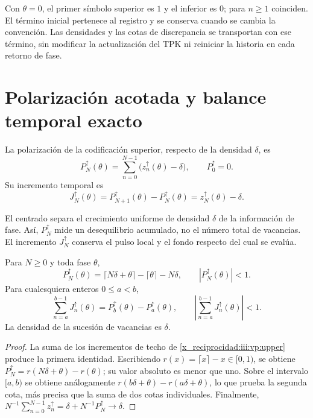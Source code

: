 Con $\theta=0$, el primer símbolo superior es $1$ y el inferior es $0$;
para $n\geq1$ coinciden. El término inicial pertenece al registro y se
conserva cuando se cambia la convención. Las densidades y las cotas de
discrepancia se transportan con ese término, sin modificar la actualización
del TPK ni reiniciar la historia en cada retorno de fase.

\section{Polarización acotada y balance temporal exacto}

\begin{definition}
La polarización de la codificación superior, respecto de la densidad
$\delta$, es
\begin{equation}
 P_N^{\uparrow}(\theta)
 =\sum_{n=0}^{N-1}\bigl(z_n^{\uparrow}(\theta)-\delta\bigr),
 \qquad P_0^{\uparrow}=0.
 \label{x_reciprocidad:iii:vp:polarization}
\end{equation}
Su incremento temporal es
\begin{equation}
 J_N^{\uparrow}(\theta)
 =P_{N+1}^{\uparrow}(\theta)-P_N^{\uparrow}(\theta)
 =z_N^{\uparrow}(\theta)-\delta.
 \label{x_reciprocidad:iii:vp:current}
\end{equation}
\end{definition}

El centrado separa el crecimiento uniforme de densidad $\delta$ de la
información de fase. Así, $P_N^{\uparrow}$ mide un desequilibrio acumulado,
no el número total de vacancias. El incremento $J_N^{\uparrow}$ conserva
el pulso local y el fondo respecto del cual se evalúa.

\begin{theorem}
Para $N\geq0$ y toda fase $\theta$,
\begin{equation}
 P_N^{\uparrow}(\theta)
 =\lceil N\delta+\theta\rceil-\lceil\theta\rceil-N\delta,
 \qquad |P_N^{\uparrow}(\theta)|<1.
 \label{x_reciprocidad:iii:vp:bound}
\end{equation}
Para cualesquiera enteros $0\leq a<b$,
\begin{equation}
 \sum_{n=a}^{b-1}J_n^{\uparrow}(\theta)
 =P_b^{\uparrow}(\theta)-P_a^{\uparrow}(\theta),
 \qquad
 \left|\sum_{n=a}^{b-1}J_n^{\uparrow}(\theta)\right|<1.
 \label{x_reciprocidad:iii:vp:continuity}
\end{equation}
La densidad de la sucesión de vacancias es $\delta$.
\end{theorem}
\begin{proof}
La suma de los incrementos de techo de \eqref{x_reciprocidad:iii:vp:upper} produce la
primera identidad. Escribiendo $r(x)=\lceil x\rceil-x\in[0,1)$,
se obtiene $P_N^{\uparrow}=r(N\delta+\theta)-r(\theta)$; su valor
absoluto es menor que uno. Sobre el intervalo $[a,b)$ se obtiene
análogamente $r(b\delta+\theta)-r(a\delta+\theta)$, lo que prueba
la segunda cota, más precisa que la suma de dos cotas individuales.
Finalmente,
$N^{-1}\sum_{n=0}^{N-1}z_n^{\uparrow}
=\delta+N^{-1}P_N^{\uparrow}\to\delta$.
\end{proof}


